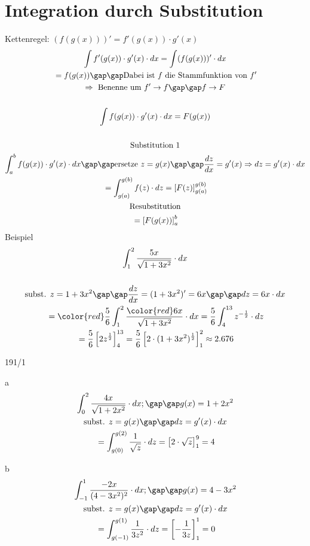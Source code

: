 \section{Integration durch Substitution}
Kettenregel: $(f(g(x)))' = f'(g(x)) \cdot g'(x)$ \\
\begin{gather*}
  \int f'(g(x)) \cdot g'(x) \cdot dx = \int (f(g(x)))' \cdot dx \\
  \;= f(g(x)) \gap\gap \text{Dabei ist $f$ die Stammfunktion von $f'$} \\
  \Rightarrow \text{ Benenne um $f' \rightarrow f \gap\gap f \rightarrow F$} \\\\
  \int f(g(x)) \cdot g'(x) \cdot dx = F(g(x)) \\\\
  \text{Substitution 1} \\
  \int_a^b f(g(x)) \cdot g'(x) \cdot dx \gap\gap \text{ersetze $z = g(x) \gap\gap \frac{dz}{dx} = g'(x) \Rightarrow dz = g'(x) \cdot dx$} \\
  \;= \int_{g(a)}^{g(b)} f(z) \cdot dz = \left[F(z)\right]_{g(a)}^{g(b)} \\
  \text{Resubstitution} \\
  \;= \left[F(g(x))\right]_a^b
\end{gather*}
Beispiel
\begin{gather*}
  \int_1^2 \frac{5x}{\sqrt{1 + 3x^2}} \cdot dx \\\\
  \text{subst. } z = 1 + 3x^2 \gap\gap \frac{dz}{dx} = (1 + 3x^2)' = 6x \gap\gap dz = 6x \cdot dx \\
  \;= {\color{red}\frac{5}{6}} \int_1^2 \frac{{\color{red}6}x}{\sqrt{1 + 3x^2}} \cdot dx = \frac{5}{6} \int_4^{13} z^{-\frac{1}{2}} \cdot dz \\
  \;= \frac{5}{6} \left[2z^\frac{1}{2}\right]_4^{13} = \frac{5}{6} \left[2 \cdot (1 + 3x^2)^\frac{1}{2}\right]_1^2 \approx 2.676
\end{gather*}
\newpage
\begin{exercise}{191/1}
  \item [a]
  \begin{gather*}
    \int_0^2 \frac{4x}{\sqrt{1 + 2x^2}} \cdot dx; \gap\gap g(x) = 1 + 2x^2 \\
    \text{subst. } z = g(x) \gap\gap dz = g'(x) \cdot dx \\
    \;= \int_{g(0)}^{g(2)} \frac{1}{\sqrt{z}} \cdot dz = \left[2 \cdot \sqrt{z}\right]_1^9 = 4
  \end{gather*}
  \item [b]
  \begin{gather*}
    \int_{-1}^1 \frac{-2x}{(4 - 3x^2)^2} \cdot dx; \gap\gap g(x) = 4 - 3x^2 \\
    \text{subst. } z = g(x) \gap\gap dz = g'(x) \cdot dx \\
    \;= \int_{g(-1)}^{g(1)} \frac{1}{3z^2} \cdot dz = \left[-\frac{1}{3z}\right]_1^1 = 0
  \end{gather*}
\end{exercise}
